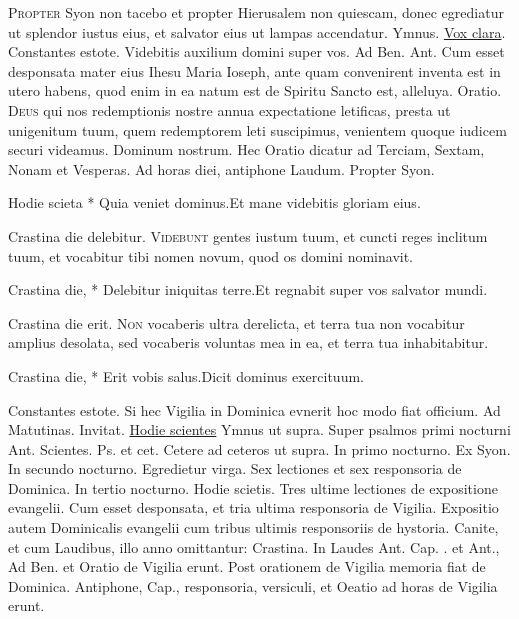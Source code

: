 \begin{multicols*}{2}
\lettrine[lines=2]{\zallmancaps \color{Blue} P}{ropter} Syon non tacebo et propter Hierusalem non quiescam, donec egrediatur ut splendor iustus eius, et salvator eius ut lampas accendatur. {\color{Red} Ymnus.} \hyperlink{vox-clara}{Vox clara}. \V Constantes estote. \R Videbitis auxilium domini super vos. {\color{Red} Ad Ben. Ant.} Cum esset desponsata mater eius Ihesu Maria Ioseph, ante quam convenirent inventa est in utero habens, quod enim in ea natum est de Spiritu Sancto est, alleluya. {\color{Red} Oratio.}
\lettrine[lines=2]{\zallmancaps \color{Red} D}{eus} qui nos redemptionis nostre annua expectatione letificas, presta ut unigenitum tuum, quem redemptorem leti suscipimus, venientem quoque iudicem securi videamus. Dominum nostrum.
\newline Hec Oratio dicatur ad Terciam, Sextam, Nonam et Vesperas. Ad horas diei, antiphone Laudum.
 Propter Syon.
\begin{responsory-breve}
{Hodie scieta * Quia veniet dominus.}{Et mane videbitis gloriam eius.}
\end{responsory-breve}
\V Crastina die delebitur.
\lettrine[lines=2]{\zallmancaps \color{Blue} V}{idebunt} gentes iustum tuum, et cuncti reges inclitum tuum, et vocabitur tibi nomen novum, quod os domini nominavit.
\begin{responsory-breve}
{Crastina die, * Delebitur iniquitas terre.}{Et regnabit super vos salvator mundi.}
\end{responsory-breve}
\V Crastina die erit.
\lettrine[lines=2]{\zallmancaps \color{Red} N}{on} vocaberis ultra derelicta, et terra tua non vocabitur amplius desolata, sed vocaberis voluntas mea in ea, et terra tua inhabitabitur.
\begin{responsory-breve}
{Crastina die, * Erit vobis salus.}{Dicit dominus exercituum.}
\end{responsory-breve}
\V Constantes estote.
\newline Si hec Vigilia in Dominica evnerit hoc modo fiat officium. Ad Matutinas. Invitat. \hyperlink{hodie-scietis}{Hodie scientes} Ymnus ut supra. Super psalmos primi nocturni Ant. Scientes. Ps.  et cet. Cetere ad ceteros ut supra. In primo nocturno. \Vbar Ex Syon. In secundo nocturno. \Vbar Egredietur virga. Sex lectiones et sex responsoria de Dominica. In tertio nocturno. \Vbar Hodie scietis. Tres ultime lectiones de expositione evangelii. Cum esset desponsata, et tria ultima responsoria de Vigilia. Expositio autem Dominicalis evangelii cum tribus ultimis responsoriis de hystoria. Canite, et cum Laudibus, illo anno omittantur: \Vbar Crastina. In Laudes Ant. Cap. \Vbar . et Ant., Ad Ben. et Oratio de Vigilia erunt. Post orationem de Vigilia memoria fiat de Dominica. Antiphone, Cap., responsoria, versiculi, et Oeatio ad horas de Vigilia erunt.

\end{multicols*}
